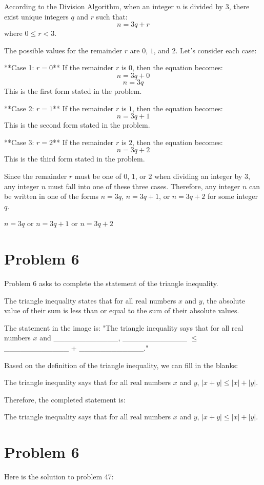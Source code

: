 \documentclass{article}
\begin{document}
According to the Division Algorithm, when an integer $n$ is divided by $3$, there exist unique integers $q$ and $r$ such that:
$$n = 3q + r$$
where $0 \le r < 3$.

The possible values for the remainder $r$ are $0$, $1$, and $2$. Let's consider each case:

**Case 1: $r = 0$**
If the remainder $r$ is $0$, then the equation becomes:
$$n = 3q + 0$$
$$n = 3q$$
This is the first form stated in the problem.

**Case 2: $r = 1$**
If the remainder $r$ is $1$, then the equation becomes:
$$n = 3q + 1$$
This is the second form stated in the problem.

**Case 3: $r = 2$**
If the remainder $r$ is $2$, then the equation becomes:
$$n = 3q + 2$$
This is the third form stated in the problem.

Since the remainder $r$ must be one of $0$, $1$, or $2$ when dividing an integer by $3$, any integer $n$ must fall into one of these three cases. Therefore, any integer $n$ can be written in one of the forms $n=3q$, $n=3q+1$, or $n=3q+2$ for some integer $q$.

$\boxed{n=3q \text{ or } n=3q+1 \text{ or } n=3q+2}$

\newpage

\section*{Problem 6}
Problem 6 asks to complete the statement of the triangle inequality.

The triangle inequality states that for all real numbers $x$ and $y$, the absolute value of their sum is less than or equal to the sum of their absolute values.

The statement in the image is: "The triangle inequality says that for all real numbers $x$ and \_\_\_\_\_\_\_\_\_\_\_\_, \_\_\_\_\_\_\_\_\_\_\_\_ $\le$ \_\_\_\_\_\_\_\_\_\_\_\_ + \_\_\_\_\_\_\_\_\_\_\_\_."

Based on the definition of the triangle inequality, we can fill in the blanks:

The triangle inequality says that for all real numbers $x$ and $y$, $|x + y| \le |x| + |y|$.

Therefore, the completed statement is:

The triangle inequality says that for all real numbers $x$ and $y$, $|x+y| \le |x| + |y|$.

\newpage

\section*{Problem 6}
Here is the solution to problem 47:
\end{document}
